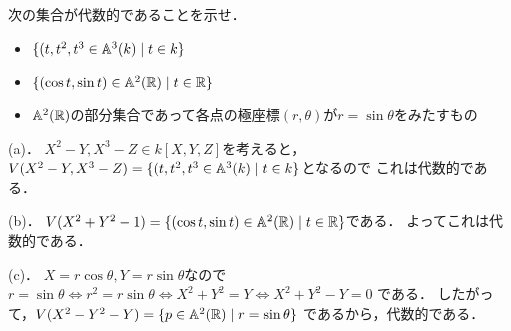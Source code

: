 \begin{prob}
  次の集合が代数的であることを示せ．
  \begin{itemize}
    \item[(a)] $\{ (t,t^2,t^3 \in \mathbb{A}^3(k) \mid t \in k \}$
    \item[(b)] $\{ (\cos t, \sin t) \in \mathbb{A}^2(\mathbb{R}) \mid t \in \mathbb{R} \} $
    \item[(c)] $\mathbb{A}^2(\mathbb{R})$の部分集合であって各点の極座標$(r,\theta)$が$r=\sin \theta$をみたすもの
  \end{itemize}
\end{prob}
\begin{ans}
  (a)．
  $X^2-Y, X^3-Z \in k[X,Y,Z]$を考えると，
  $V(X^2-Y,X^3-Z) = \{ (t,t^2,t^3 \in \mathbb{A}^3(k) \mid t \in k \}$となるので
  これは代数的である．
  
  (b)．
  $V(X^2 + Y^2 - 1) = \{ (\cos t, \sin t) \in \mathbb{A}^2(\mathbb{R}) \mid t \in \mathbb{R} \} $である．
  よってこれは代数的である．

  (c)．
  $X = r \cos \theta, Y = r \sin \theta$なので
  $ r = \sin \theta
  \Leftrightarrow r^2 = r \sin \theta
  \Leftrightarrow X^2 + Y^2 = Y
  \Leftrightarrow X^2 + Y^2 - Y = 0 $
  である．
  したがって，$V(X^2 - Y^2 - Y) = \{ p \in \mathbb{A}^2(\mathbb{R}) \mid r = \sin \theta \} $
  であるから，代数的である．
\end{ans}
